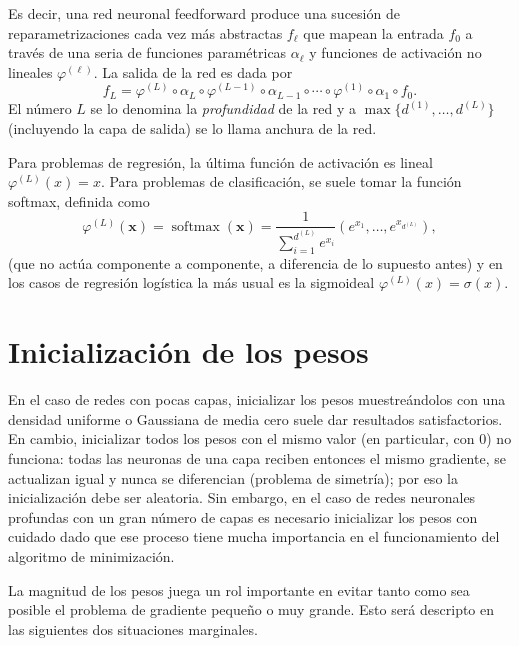 \documentclass[12pt, a4paper]{amsbook}
\def\softmax{\operatorname {\mathrm{softmax}}}
\newcommand{\xx}{{\mathbf x}}
\theoremstyle{remark}
\theoremstyle{definition}
\numberwithin{section}{chapter}
\numberwithin{subsection}{section}
\numberwithin{equation}{section}
\numberwithin{figure}{chapter}
\begin{document}
Es decir, una red neuronal feedforward produce una sucesión de reparametrizaciones cada vez más abstractas $f_\ell$ que mapean la entrada $f_0$ a través de una seria de funciones paramétricas $\alpha_\ell$ y funciones de activación no lineales $\varphi^{(\ell)}$. La salida de la red es dada por
$$
f_L = \varphi^{(L)}\circ \alpha_L\circ \varphi^{(L-1)}\circ\alpha_{L-1}\circ\cdots\circ \varphi^{(1)}\circ \alpha_1\circ f_0.
$$
El número $L$ se lo denomina la {\em profundidad} de la red y a $\max\{d^{(1)},\dots, d^{(L)}\}$ (incluyendo la capa de salida) se lo llama anchura de la red.

Para problemas de regresión, la última función de activación es lineal $\varphi^{(L)}(x)=x$. Para problemas de clasificación, se suele tomar la función softmax, definida como
$$
\varphi^{(L)}(\xx) = \softmax(\xx) = \frac{1}{\sum_{i=1}^{d^{(L)}} e^{x_i}}(e^{x_1},\dots,e^{x_{d^{(L)}}}),
$$
(que no actúa componente a componente, a diferencia de lo supuesto antes) y en los casos de regresión logística la más usual es la sigmoideal $\varphi^{(L)}(x) = \sigma(x)$.

\section{Inicialización de los pesos}\label{sec.c6.3}

En el caso de redes con pocas capas, inicializar los pesos muestreándolos con una densidad uniforme o Gaussiana de media cero suele dar resultados satisfactorios. En cambio, inicializar todos los pesos con el mismo valor (en particular, con 0) no funciona: todas las neuronas de una capa reciben entonces el mismo gradiente, se actualizan igual y nunca se diferencian (problema de simetría); por eso la inicialización debe ser aleatoria. Sin embargo, en el caso de redes neuronales profundas con un gran número de capas es necesario inicializar los pesos con cuidado dado que ese proceso tiene mucha importancia en el funcionamiento del algoritmo de minimización.

La magnitud de los pesos juega un rol importante en evitar tanto como sea posible el problema de gradiente pequeño o muy grande. Esto será descripto en las siguientes dos situaciones marginales.
\end{document}
